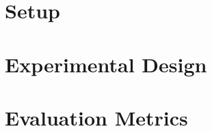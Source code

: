 \documentclass[report.tex]{subfiles}
\begin{document}


    
    



    \section{Setup}

    \section{Experimental Design}

    \section{Evaluation Metrics}

    
\end{document}
